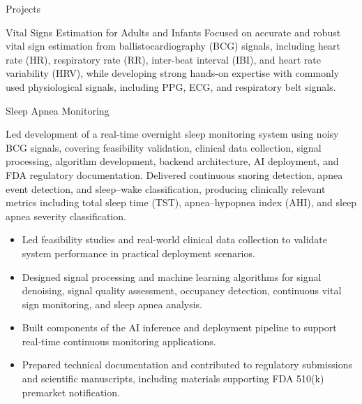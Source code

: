 \documentclass{resume} %
\begin{document}

\begin{rSection}{Projects}
\begin{rSubsection}{Vital Signs Estimation for Adults and Infants}{}{}{}
\vspace{-.1cm}
\small
Focused on accurate and robust vital sign estimation from ballistocardiography (BCG) signals, including heart rate (HR), respiratory rate (RR), inter-beat interval (IBI), and heart rate variability (HRV), while developing strong hands-on expertise with commonly used physiological signals, including PPG, ECG, and respiratory belt signals.
\end{rSubsection}


\begin{rSubsection}{Sleep Apnea Monitoring}{}{}{}
\vspace{-.1cm}



Led development of a real-time overnight sleep monitoring system using noisy BCG signals, covering feasibility validation, clinical data collection, signal processing, algorithm development, backend architecture, AI deployment, and FDA regulatory documentation. Delivered continuous snoring detection, apnea event detection, and sleep--wake classification, producing clinically relevant metrics including total sleep time (TST), apnea--hypopnea index (AHI), and sleep apnea severity classification.
\vspace{-0.4em}
\begin{itemize}
  \setlength{\itemsep}{0pt}
  \setlength{\parskip}{0pt}
  \setlength{\parsep}{0pt}
  \item Led feasibility studies and real-world clinical data collection to validate system performance in practical deployment scenarios.
  \item Designed signal processing and machine learning algorithms for signal denoising, signal quality assessment, occupancy detection, continuous vital sign monitoring, and sleep apnea analysis.
  \item Built components of the AI inference and deployment pipeline to support real-time continuous monitoring applications.
  \item Prepared technical documentation and contributed to regulatory submissions and scientific manuscripts, including materials supporting FDA 510(k) premarket notification.
\end{itemize}


\end{rSubsection}
\end{rSection}
\end{document}
